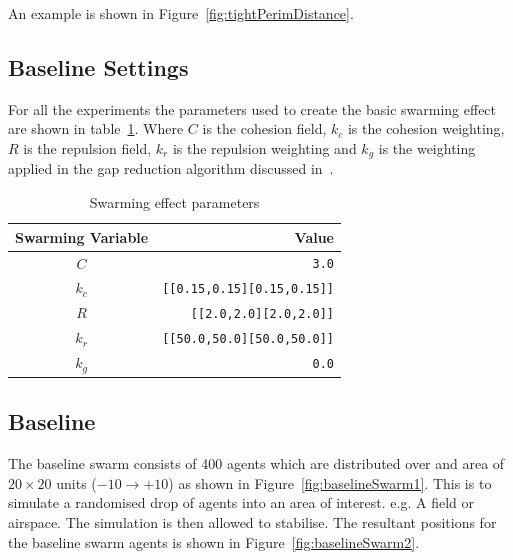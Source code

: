 \documentclass[12pt,a4paper]{IEEEtran}
\newcommand{\kc}{\mathit{k_{c}}}
\newcommand{\kr}{\mathit{k_{r}}}
\newcommand{\kg}{\mathit{k_{g}}}
\newcommand{\rb}{\mathit{R}}
\begin{document}
An example is shown in Figure~\ref{fig:tightPerimDistance}.

\subsection{Baseline Settings}
For all the experiments the parameters used to create the basic swarming effect are shown in table~\ref{tab:swarmingEffect}. Where $C$ is the cohesion field, $\kc$ is the cohesion weighting, $\rb$ is the repulsion field, $\kr$ is the repulsion weighting and $\kg$ is the weighting applied in the gap reduction algorithm discussed in~\cite{eliot2019void}. 

\begin{table}[H]
	\centering
	\tiny
	\begin{tabular}{|c|r|}
		\hline
		\rowcolor[HTML]{000000} 
		{\color[HTML]{FFFFFF} Swarming Variable} & {\color[HTML]{FFFFFF} Value} \\ \hline
		$C$ & \texttt{3.0} \\ \hline
		$k_c$ & \texttt{[[0.15,0.15][0.15,0.15]]}  \\ \hline
		$R$ & \texttt{[[2.0,2.0][2.0,2.0]]} \\ \hline
		$k_r$ & \texttt{[[50.0,50.0][50.0,50.0]]} \\ \hline
		$k_g$ & \texttt{0.0} \\ \hline
	\end{tabular}
	\caption{Swarming effect parameters}
	\label{tab:swarmingEffect}
\end{table}

\subsection{Baseline}
The baseline swarm consists of 400 agents which are distributed over and area of $20\times 20$ units ($-10\rightarrow+10$) as shown in Figure~\ref{fig:baselineSwarm1}. This is to simulate a randomised drop of agents into an area of interest. e.g. A field or airspace. The simulation is then allowed to stabilise. The resultant positions for the baseline swarm agents is shown in Figure~\ref{fig:baselineSwarm2}. 
\end{document}
